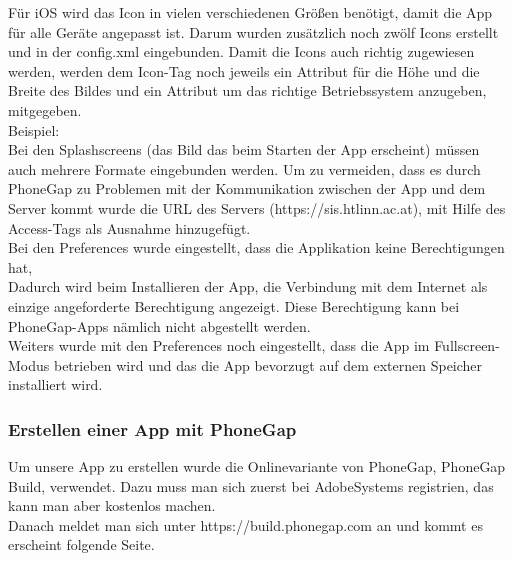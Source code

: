 Für iOS wird das Icon in vielen verschiedenen Größen benötigt, damit die App für alle Geräte angepasst ist. Darum wurden zusätzlich noch zwölf Icons erstellt und in der config.xml eingebunden. Damit die Icons auch richtig zugewiesen werden, werden dem Icon-Tag noch jeweils ein Attribut für die Höhe und die Breite des Bildes und ein Attribut um das richtige Betriebssystem anzugeben, mitgegeben.\\
Beispiel:\\


	

Bei den Splashscreens (das Bild das beim Starten der App erscheint) müssen auch mehrere Formate eingebunden werden.
Um zu vermeiden, dass es durch PhoneGap zu Problemen mit der Kommunikation zwischen der App und dem Server kommt wurde die URL des Servers (https://sis.htlinn.ac.at), mit Hilfe des Access-Tags als Ausnahme hinzugefügt.\\

Bei den Preferences wurde eingestellt, dass die Applikation keine Berechtigungen hat,\\



Dadurch wird beim Installieren der App, die Verbindung mit dem Internet als einzige angeforderte Berechtigung angezeigt. Diese Berechtigung kann bei PhoneGap-Apps nämlich nicht abgestellt werden.\\

Weiters wurde mit den Preferences noch eingestellt, dass die App im Fullscreen-Modus betrieben wird und das die App bevorzugt auf dem externen Speicher installiert wird.\\


\subsubsection{Erstellen einer App mit PhoneGap}
Um unsere App zu erstellen wurde die Onlinevariante von PhoneGap, PhoneGap Build, verwendet. Dazu muss man sich zuerst bei AdobeSystems registrien, das kann man aber kostenlos machen.\\
Danach meldet man sich unter https://build.phonegap.com an und kommt es erscheint folgende Seite.\\

